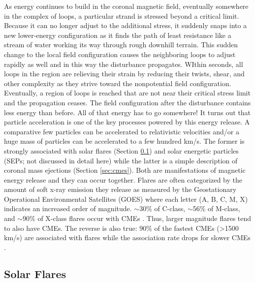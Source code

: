 As energy continues to build in the coronal magnetic field, eventually somewhere in the complex of loops, a particular strand is stressed beyond a critical limit. Because it can no longer adjust to the additional stress, it suddenly snaps into a new lower-energy configuration as it finds the path of least resistance like a stream of water working its way through rough downhill terrain. This sudden change to the local field configuration causes the neighboring loops to adjust rapidly as well and in this way the disturbance propagates. WIthin seconds, all loops in the region are relieving their strain by reducing their twists, shear, and other complexity as they strive toward the nonpotential field configuration. Eventually, a region of loops is reached that are not near their critical stress limit and the propagation ceases. The field configuration after the disturbance contains less energy than before. All of that energy has to go somewhere! It turns out that particle acceleration is one of the key processes powered by this energy release. A comparative few particles can be accelerated to relativistic velocities and/or a huge mass of particles can be accelerated to a few hundred km/s. The former is strongly associated with solar flares (Section \ref{sec:solarflares}) and solar energetic particles (SEPs; not discussed in detail here) while the latter is a simple description of coronal mass ejections (Section \ref{sec:cmes}). Both are manifestations of magnetic energy release and they can occur together. Flares are often categorized by the amount of soft x-ray emission they release as measured by the Geostationary Operational Environmental Satellites (GOES) where each letter (A, B, C, M, X) indicates an increased order of magnitude. $\sim$30\% of C-class, $\sim$56\% of M-class, and $\sim$90\% of X-class flares occur with CMEs \citep{Yashiro2005, Wang2007}. Thus, larger magnitude flares tend to also have CMEs. The reverse is also true: 90\% of the fastest CMEs (\textgreater 1500 km/s) are associated with flares while the association rate drops for slower CMEs \citep{Wang2008}. 

\subsection{Solar Flares}
\label{sec:solarflares}

